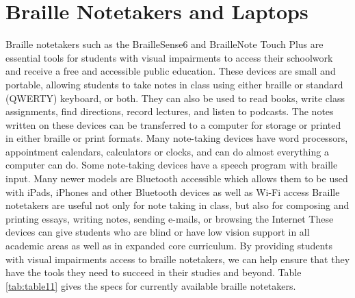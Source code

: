 \pagebreak
\hypertarget{braille-notetakers-and-braille-laptop-computers}{}\section{Braille Notetakers and Laptops}\label{braille-notetakers-and-braille-laptop-computers}

Braille notetakers such as the BrailleSense6 and BrailleNote Touch Plus are essential tools for students with visual impairments to access their schoolwork and receive a free and accessible public education. These devices are small and portable, allowing students to take notes in class using either braille or standard (QWERTY) keyboard, or both. They can also be used to read books, write class assignments, find directions, record lectures, and listen to podcasts. The notes written on these devices can be transferred to a computer for storage or printed in either braille or print formats. Many note-taking devices have word processors, appointment calendars, calculators or clocks, and can do almost everything a computer can do. Some note-taking devices have a speech program with braille input. Many newer models are Bluetooth accessible which allows them to be used with iPads, iPhones and other Bluetooth devices as well as Wi-Fi access Braille notetakers are useful not only for note taking in class, but also for composing and printing essays, writing notes, sending e-mails, or browsing the Internet These devices can give students who are blind or have low vision support in all academic areas as well as in expanded core curriculum. By providing students with visual impairments access to braille notetakers, we can help ensure that they have the tools they need to succeed in their studies and beyond. Table \ref{tab:table11} gives the specs for currently available braille notetakers.

